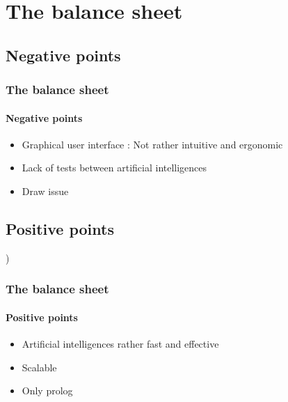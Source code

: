 \documentclass[a4paper, 11pt]{beamer}
\begin{document}
\section{The balance sheet}
\subsection{Negative points}
\begin{frame}
 \frametitle{The balance sheet}
 \framesubtitle{Negative points}
 \begin{itemize}
  \item Graphical user interface : Not rather intuitive and ergonomic
  \pause
  \item Lack of tests between artificial intelligences
  \pause
  \item Draw issue
 \end{itemize}
\end{frame}

\subsection{Positive points})
\begin{frame}
 \frametitle{The balance sheet}
 \framesubtitle{Positive points}
 \begin{itemize}
  \item Artificial intelligences rather fast and effective
  \pause
  \item Scalable
  \pause
  \item Only prolog
 \end{itemize}
\end{frame}
\end{document}
